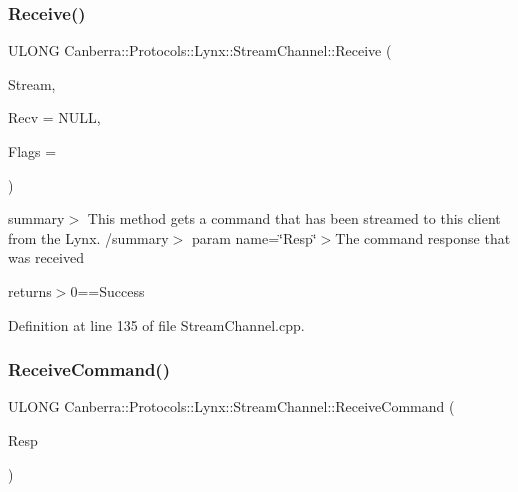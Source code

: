 \subsubsection{\texorpdfstring{Receive()}{Receive()}}
{\footnotesize\ttfamily U\+L\+O\+NG Canberra\+::\+Protocols\+::\+Lynx\+::\+Stream\+Channel\+::\+Receive (\begin{DoxyParamCaption}\item[{\hyperlink{class_canberra_1_1_utility_1_1_core_1_1_byte_stream}{Canberra\+::\+Utility\+::\+Core\+::\+Byte\+Stream} \&}]{Stream,  }\item[{U\+L\+O\+NG $\ast$}]{Recv = {\ttfamily NULL},  }\item[{L\+O\+NG}]{Flags = {} }\end{DoxyParamCaption})\hspace{0.3cm}{\ttfamily [protected]}}

summary$>$ This method gets a command that has been streamed to this client from the Lynx. /summary$>$ param name=\char`\"{}\+Resp\char`\"{}$>$The command response that was received

returns$>$0==Success

Definition at line 135 of file Stream\+Channel.\+cpp.

\mbox{\label{class_canberra_1_1_protocols_1_1_lynx_1_1_stream_channel_a629b6f9979646a09818c66aff827361d_a629b6f9979646a09818c66aff827361d}} 
\subsubsection{\texorpdfstring{Receive\+Command()}{ReceiveCommand()}}
{\footnotesize\ttfamily U\+L\+O\+NG Canberra\+::\+Protocols\+::\+Lynx\+::\+Stream\+Channel\+::\+Receive\+Command (\begin{DoxyParamCaption}\item[{\hyperlink{class_canberra_1_1_data_types_1_1_application_1_1_command_data}{Canberra\+::\+Data\+Types\+::\+Application\+::\+Command\+Data} $\ast$$\ast$}]{Resp }\end{DoxyParamCaption})}

